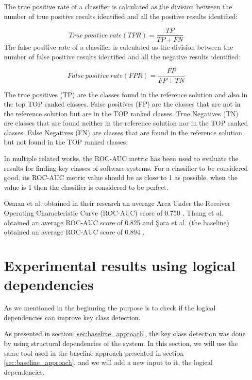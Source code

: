 \documentclass[runningheads]{comsis2}
\begin{document}
The true positive rate of a classifier is calculated as the division between the number of true positive results identified and all the positive results identified:

\begin{equation}
 True\ positive\ rate (TPR) = \frac{TP}{TP+FN}
\end{equation}
The false positive rate of a classifier is calculated as the division between the number of false positive results identified and all the negative results identified:

\begin{equation}
 False\ positive\ rate (FPR) = \frac{FP}{FP+TN}
\end{equation}

The true positives (TP) are the classes found in the reference solution and also in the top TOP ranked classes. False positives (FP) are the classes that are not in the reference solution but are in the TOP ranked classes.
True Negatives (TN) are classes that are found neither in the reference solution nor in the TOP ranked classes. False Negatives (FN) are classes that are found in the reference solution but not found in the TOP ranked classes.

In multiple related works, the ROC-AUC metric has been used to evaluate the results for finding key classes of software systems.
For a classifier to be considered good, its ROC-AUC metric value should be as close to 1 as possible, when the value is 1 then the classifier is considered to be perfect.

Osman et al. obtained in their research an average Area Under the Receiver Operating Characteristic Curve (ROC-AUC) score of 0.750 \cite{6676885}. Thung et al. obtained an average ROC-AUC score of 0.825 \cite{rocclasification}  and Şora et al. (the baseline) obtained an average ROC-AUC score of 0.894 \cite{Finding-key-classes}.



\section{Experimental results using logical dependencies}
\label{sec:current_measurements}

As we mentioned in the beginning the purpose is to check if the logical dependencies can improve key class detection. 

As presented in section \ref{sec:baseline_approach}, the key class detection was done by using structural dependencies of the system. 
In this section, we will use the same tool used in the baseline approach presented in section \ref{sec:baseline_approach}, and we will add a new input to it, the logical dependencies. 
\end{document}
